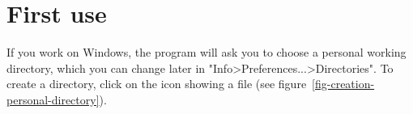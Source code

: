 
   















\section{First use}
\label{section-first-use}
If you work on Windows, the program will ask you to choose a
 personal working  directory, which you can
change later in "Info>Preferences...>Directories". To create a directory, click
on the icon showing a file (see
figure~\ref{fig-creation-personal-directory}).

